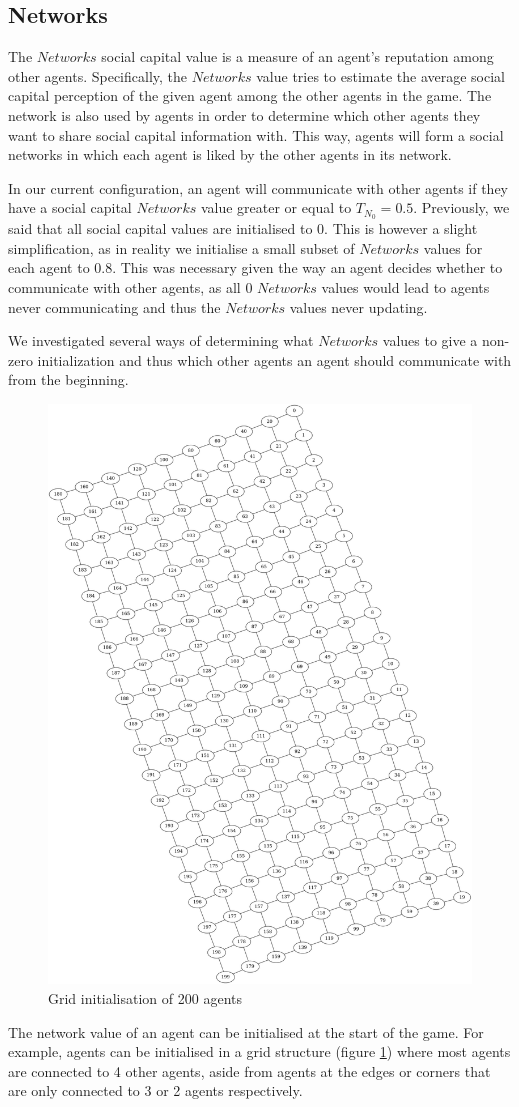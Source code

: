 \subsection{Networks}
The $Networks$ social capital value is a measure of an agent's reputation among other agents. Specifically, the $Networks$ value tries to estimate the average social capital perception of the given agent among the other agents in the game. The network is also used by agents in order to determine which other agents they want to share social capital information with. This way, agents will form a social networks in which each agent is liked by the other agents in its network.

In our current configuration, an agent will communicate with other agents if they have a social capital $Networks$ value greater or equal to $T_{N_0} = 0.5$. Previously, we said that all social capital values are initialised to 0. This is however a slight simplification, as in reality we initialise a small subset of $Networks$ values for each agent to 0.8. This was necessary given the way an agent decides whether to communicate with other agents, as all 0 $Networks$ values would lead to agents never communicating and thus the $Networks$ values never updating. 

We investigated several ways of determining what $Networks$ values to give a non-zero initialization and thus which other agents an agent should communicate with from the beginning.

\begin{figure}[!ht]
    \centering
    \includegraphics[width=0.4\linewidth]{004_team_1_agent_design/images/sc_network_grid.png}
    \caption{Grid initialisation of 200 agents}
    \label{fig:sc_network_grid}
\end{figure}

The network value of an agent can be initialised at the start of the game. For example, agents can be initialised in a grid structure (figure \ref{fig:sc_network_grid}) where most agents are connected to 4 other agents, aside from agents at the edges or corners that are only connected to 3 or 2 agents respectively.

